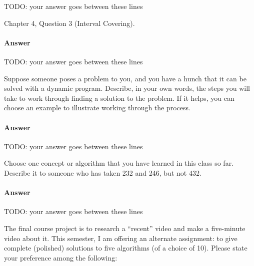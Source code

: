 \documentclass{article}
\begin{document}
TODO: your answer goes between these lines



\nextprob
{}

Chapter 4, Question 3 (Interval Covering).

\paragraph{Answer}

TODO: your answer goes between these lines


\nextprob
{}

Suppose someone poses a problem to you, and you have a hunch that it can be
solved with a dynamic program.  Describe, in your own words, the steps you will
take to work through finding a solution to the problem.  If it helps, you can
choose an example to illustrate working through the process.

\paragraph{Answer}


TODO: your answer goes between these lines




\nextprob
{}

Choose one concept or algorithm that you have learned
in this class so far. Describe it to someone who has
taken 232 and 246, but not 432.

\paragraph{Answer}


TODO: your answer goes between these lines


\nextprob
{}

The final course project is to research a ``recent'' video and make a
five-minute video about it.  This semester, I am offering an alternate
assignment: to give complete (polished) solutions to five algorithms (of a
choice of 10).
Please state your preference among the following:
\end{document}
